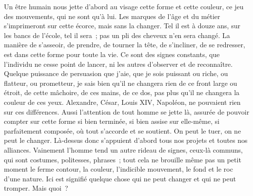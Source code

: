 %
	{Un être humain nous jette d'abord au visage cette forme et cette
couleur, ce jeu des mouvements, qui ne sont qu'à lui. Les marques de
l'âge et du métier s'imprimeront sur cette écorce, mais sans la
changer. Tel il est à douze ans, sur les bancs de l'école, tel il
sera~; pas un pli des cheveux n'en sera changé. La manière de
s'asseoir, de prendre, de tourner la tête, de s'incliner, de se
redresser, est dans cette forme pour toute la vie. Ce sont des signes
constants, que l'individu ne cesse point de lancer, ni les autres
d'observer et de reconnaître. Quelque puissance de persuasion que
j'aie, que je sois puissant ou riche, ou flatteur, ou prometteur, je
sais bien qu'il ne changera rien de ce front large ou étroit, de
cette mâchoire, de ces mains, de ce dos, pas plus qu'il ne changera
la couleur de ces yeux. Alexandre, César, Louis XIV, Napoléon, ne
pouvaient rien sur ces différences. Aussi l'attention de tout homme
se jette là, assurée de pouvoir compter sur cette forme si bien
terminée, si bien assise sur elle-même, si parfaitement composée, où
tout s'accorde et se soutient. On peut le tuer, on ne peut le
changer. Là-dessus donc s'appuient d'abord tous nos projets et toutes
nos alliances. Vainement l'homme tend un autre rideau de signes,
ceux-là communs, qui sont costumes, politesses, phrases~; tout cela
ne brouille même pas un petit moment le ferme contour, la couleur,
l'indicible mouvement, le fond et le roc d'une nature. Ici est
signifié quelque chose qui ne peut changer et qui ne peut tromper.
Mais quoi~?
}


